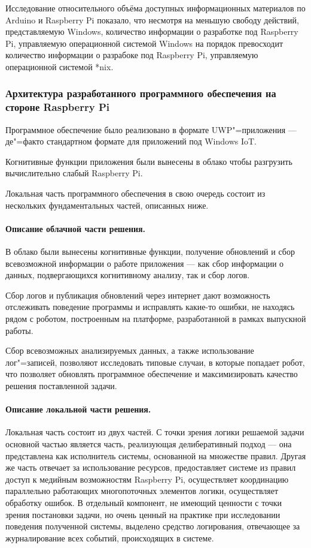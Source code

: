 Исследование относительного объёма доступных информационных материалов по Arduino и Raspberry Pi показало, что несмотря на меньшую свободу действий, представляемую Windows, количество информации о разработке под Raspberry Pi, управляемую операционной системой Windows на порядок превосходит количество информации о разрабоке под Raspberry Pi, управляемую операционной системой *nix. 

\subsubsection{Архитектура разработанного программного обеспечения на стороне Raspberry Pi}
Программное обеспечение было реализовано в формате UWP"=приложения --- де"=факто стандартном формате для приложений под Windows IoT.

Когнитивные функции приложения были вынесены в облако чтобы разгрузить вычислительно слабый Raspberry Pi.

Локальная часть программного обеспечения в свою очередь состоит из нескольких фундаментальных частей, описанных ниже.

\paragraph*{Описание облачной части решения.} В облако были вынесены когнитивные функции, получение обновлений и сбор всевозможной информации о работе приложения --- как сбор информации о данных, подвергающихся когнитивному анализу, так и сбор логов.

Сбор логов и публикация обновлений через интернет дают возможность отслеживать поведение программы и исправлять какие-то ошибки, не находясь рядом с роботом, построенным на платформе, разработанной в рамках выпускной работы.

Сбор всевозможных анализируемых данных, а также использование лог"=записей, позволяют исследовать типовые случаи, в которые попадает робот, что позволяет обновлять программное обеспечение и максимизировать качество решения поставленной задачи.

\paragraph*{Описание локальной части решения.} Локальная часть состоит из двух частей. С точки зрения логики решаемой задачи основной частью является часть, реализующая делиберативный подход --- она представлена как исполнитель системы, основанной на множестве правил. Другая же часть отвечает за использование ресурсов, предоставляет системе из правил доступ к медийным возможностям Raspberry Pi, осуществляет координацию параллельно работающих многопоточных элементов логики, осуществляет обработку ошибок.
В отдельный компонент, не имеющий ценности с точки зрения постановки задачи, но очень ценный на практике при исследовании поведения полученной системы, выделено средство логирования, отвечающее за журналирование всех событий, происходящих в системе.

